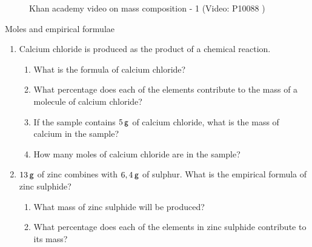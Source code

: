     \setcounter{subfigure}{0}
	\begin{figure}[H] %
    \textnormal{Khan academy video on mass composition - 1}\vspace{.1in} \nopagebreak
  \label{m38712*yt-media3}\label{m38712*yt-video3}
             { (Video:  P10088 )}
      \vspace{2pt}
    \vspace{.1in}
 \end{figure}       \par \label{m38712*secfhsst!!!underscore!!!id1437}
            \begin{exercises}{Moles and empirical formulae
      }
            \nopagebreak
      \label{m38712*id281924}\begin{enumerate}[noitemsep, label=\textbf{\arabic*}. ] 
            \label{m38712*uid73}\item Calcium chloride is produced as the product of a chemical reaction.
\label{m38712*id281940}\begin{enumerate}[noitemsep, label=\textbf{\alph*}. ] 
            \label{m38712*uid74}\item What is the formula of calcium chloride?
\label{m38712*uid75}\item What percentage does each of the elements contribute to the mass of a molecule of calcium chloride?
\label{m38712*uid76}\item If the sample contains $5\phantom{\rule{2pt}{0ex}}\mathsf{g}$ of calcium chloride, what is the mass of calcium in the sample?
\label{m38712*uid77}\item How many moles of calcium chloride are in the sample?
\end{enumerate}
                \label{m38712*uid78}\item $13\phantom{\rule{2pt}{0ex}}\mathsf{g}$ of zinc combines with $6,4\phantom{\rule{2pt}{0ex}}\mathsf{g}$ of sulphur. What is the empirical formula of zinc sulphide?
\label{m38712*id282007}\begin{enumerate}[noitemsep, label=\textbf{\alph*}. ] 
            \label{m38712*uid79}\item What mass of zinc sulphide will be produced?
\label{m38712*uid80}\item What percentage does each of the elements in zinc sulphide contribute to its mass?

\end{enumerate}
\end{enumerate}
\end{exercises}
